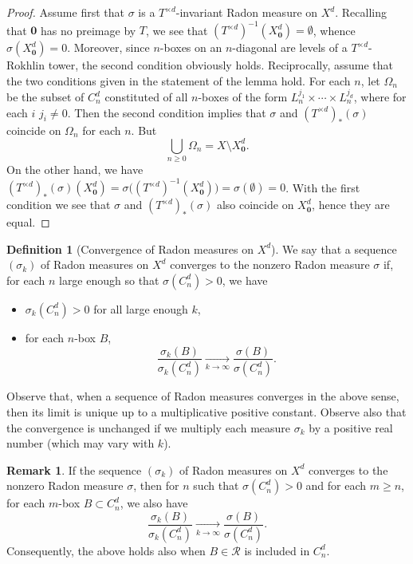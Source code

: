 \documentclass[10pt]{amsart}
\theoremstyle{definition}\newtheorem{defi}[theo]{Definition}\newtheorem{rema}[theo]{Remark}\newtheorem{exam}[theo]{Example}\newtheorem{exem}[theo]{Example}\newtheorem{nota}[theo]{Notation}
\newcommand{\tend}[3][]{\xrightarrow[#2\to#3]{#1}}
\newcommand{\cd}{C^{d}}
\newcommand{\td}{T^{\times d}}
\newcommand{\bz}{\boldsymbol{0}}
\newcommand{\ovC}{\Omega}
\begin{document}
\begin{proof}
Assume first that $\sigma$ is a $\td$-invariant Radon measure on $X^d$. Recalling that $\bz$ has no preimage by $T$, we see that $(\td)^{-1}(X_{\bz}^d)=\emptyset$, whence $\sigma\left(X_{\bz}^d\right)=0$. Moreover, since $n$-boxes on an $n$-diagonal are levels of a $\td$-Rokhlin tower, the second condition obviously holds. Reciprocally, assume that the two conditions given in the statement of the lemma hold. For each $n$, let $\ovC_n$ be the subset of $\cd_n$ constituted of all $n$-boxes of the form $L_n^{j_1}\times\cdots\times L_n^{j_d}$, where for each $i$ $j_i\neq 0$. Then the second condition implies that $\sigma$ and $(\td)_*(\sigma)$ coincide on $\ovC_n$ for each $n$. But
\[
\bigcup_{n\ge0} \ovC_n = X\setminus X_{\bz}^d.
\]
On the other hand, we have $(\td)_*(\sigma)(X_{\bz}^d)=\sigma\bigl((\td)^{-1} (X_{\bz}^d)\bigr)=\sigma(\emptyset)=0$. With the first condition we see that $\sigma$ and $(\td)_*(\sigma)$ also coincide on $X_{\bz}^d$, hence they are equal.
\end{proof}

\begin{defi}[Convergence of Radon measures on $X^d$]\label{def:convergence}
We say that a sequence $(\sigma_k)$ of Radon measures on $X^d$ converges to the nonzero Radon measure $\sigma$ if, for each $n$ large enough so that $\sigma(\cd_n)>0$, we have
\begin{itemize}
\item $\sigma_k(\cd_n)>0$ for all large enough $k$,
\item for each $n$-box $B$,
\[
\frac{\sigma_k(B)}{\sigma_k(\cd_n)} \tend{k}{\infty}
\frac{\sigma(B)}{\sigma(\cd_n)}.
\]
\end{itemize}
\end{defi}

Observe that, when a sequence of Radon measures converges in the above sense, then its limit is unique up to a multiplicative positive constant. Observe also that the convergence is unchanged if we multiply each measure $\sigma_k$ by a positive real number (which may vary with $k$).


\begin{rema}\label{rem:mn}
If the sequence $(\sigma_k)$ of Radon measures on $X^d$ converges to the nonzero Radon measure $\sigma$, then for $n$ such that $\sigma(\cd_n)>0$ and for each $m\ge n$, for each $m$-box $B\subset\cd_n$, we also have
\[
\frac{\sigma_k(B)}{\sigma_k(\cd_n)} \tend{k}{\infty}
\frac{\sigma(B)}{\sigma(\cd_n)}.
\]
Consequently, the above holds also when $B\in\mathscr{R}$ is included in $\cd_n$.
\end{rema}
\end{document}
